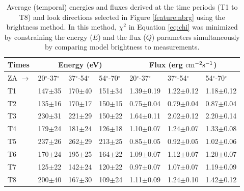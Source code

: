\begin{table}
	\caption{Average (temporal) energies and fluxes derived at the time periods (T1 to T8) and look directions selected in Figure \ref{feature:nbrg} using the brightness method. In this method, $\chi^2$ in Equation \ref{eq:chi} was minimized by constraining the energy ($E$) and the flux ($Q$) parameters simultaneously by comparing model brightness to measurements.}
	\begin{tabular}{|l|l|l|l|l|l|l|}
		\hline
		Times& \multicolumn{3}{c|}{Energy (eV)} & \multicolumn{3}{c|}{Flux (erg $\rm cm^{-2} s^{-1}$)}\\ 
		\hline
		ZA $\rightarrow$& 20$^\circ$-37$^\circ$                  & 37$^\circ$-54$^\circ$                  &54$^\circ$-70$^\circ$                &20$^\circ$-37$^\circ$               &37$^\circ$-54$^\circ$                &54$^\circ$-70$^\circ$               \\	 \hline 
		
		
		T1   &         147$\pm$35 &         170$\pm$40 &      151$\pm$34 &   1.39$\pm$0.19 &   1.22$\pm$0.12 &   1.18$\pm$0.12 \\
		T2   &         135$\pm$16 &         170$\pm$17 &      150$\pm$15 &   0.75$\pm$0.04 &   0.79$\pm$0.04 &   0.87$\pm$0.04 \\
		T3   &         230$\pm$31 &         221$\pm$29 &      150$\pm$22 &   1.64$\pm$0.11 &   2.02$\pm$0.12 &   2.20$\pm$0.14 \\
		T4   &         179$\pm$24 &         181$\pm$24 &      126$\pm$18 &   1.10$\pm$0.07 &   1.24$\pm$0.07 &   1.33$\pm$0.08 \\
		T5   &         237$\pm$26 &         262$\pm$29 &      213$\pm$25 &   0.85$\pm$0.05 &   0.92$\pm$0.05 &   1.02$\pm$0.06 \\
		T6   &         170$\pm$24 &         195$\pm$25 &      164$\pm$22 &   1.09$\pm$0.07 &   1.12$\pm$0.07 &   1.20$\pm$0.07 \\
		T7   &         125$\pm$22 &         142$\pm$24 &      120$\pm$22 &   0.97$\pm$0.07 &   1.07$\pm$0.07 &   1.19$\pm$0.09 \\
		T8   &         200$\pm$40 &         167$\pm$30 &      109$\pm$24 &   1.11$\pm$0.09 &   1.24$\pm$0.10 &   1.42$\pm$0.12 \\
		\hline
	\end{tabular}
	\label{table:efl_look}		
\end{table}




